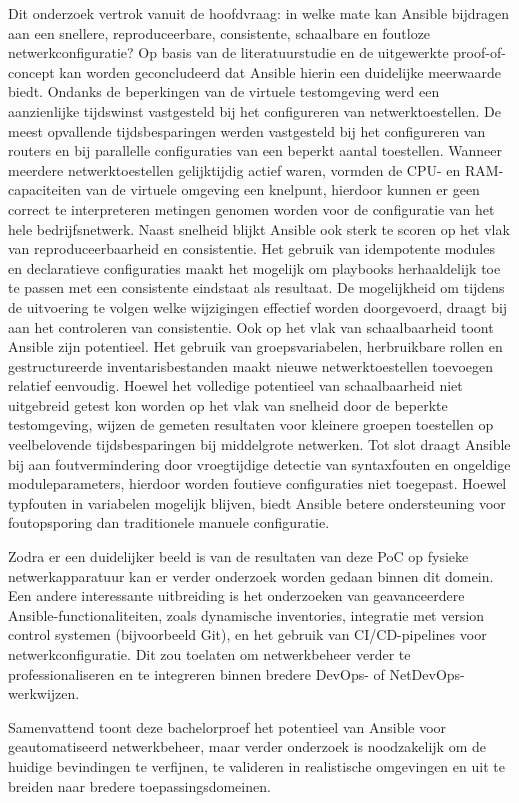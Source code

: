 Dit onderzoek vertrok vanuit de hoofdvraag: in welke mate kan Ansible bijdragen aan een snellere, reproduceerbare, consistente, schaalbare en foutloze netwerkconfiguratie?
Op basis van de literatuurstudie en de uitgewerkte proof-of-concept kan worden geconcludeerd dat Ansible hierin een duidelijke meerwaarde biedt.
Ondanks de beperkingen van de virtuele testomgeving werd een aanzienlijke tijdswinst vastgesteld bij het configureren van netwerktoestellen. 
De meest opvallende tijdsbesparingen werden vastgesteld bij het configureren van routers en bij parallelle configuraties van een beperkt aantal toestellen. 
Wanneer meerdere netwerktoestellen gelijktijdig actief waren, vormden de CPU- en RAM-capaciteiten van de virtuele omgeving een knelpunt, hierdoor kunnen er geen correct te interpreteren metingen genomen worden voor de configuratie van het hele bedrijfsnetwerk.
Naast snelheid blijkt Ansible ook sterk te scoren op het vlak van reproduceerbaarheid en consistentie. Het gebruik van idempotente modules en declaratieve configuraties maakt het mogelijk om playbooks herhaaldelijk toe te passen met een consistente eindstaat als resultaat.
De mogelijkheid om tijdens de uitvoering te volgen welke wijzigingen effectief worden doorgevoerd, draagt bij aan het controleren van consistentie.
Ook op het vlak van schaalbaarheid toont Ansible zijn potentieel. Het gebruik van groepsvariabelen, herbruikbare rollen en gestructureerde inventarisbestanden maakt nieuwe netwerktoestellen toevoegen relatief eenvoudig.
Hoewel het volledige potentieel van schaalbaarheid niet uitgebreid getest kon worden op het vlak van snelheid door de beperkte testomgeving, wijzen de gemeten resultaten voor kleinere groepen toestellen op veelbelovende tijdsbesparingen bij middelgrote netwerken.
Tot slot draagt Ansible bij aan foutvermindering door vroegtijdige detectie van syntaxfouten en ongeldige moduleparameters, hierdoor worden foutieve configuraties niet toegepast. 
Hoewel typfouten in variabelen mogelijk blijven, biedt Ansible betere ondersteuning voor foutopsporing dan traditionele manuele configuratie.
\vspace{1em}

Zodra er een duidelijker beeld is van de resultaten van deze PoC op fysieke netwerkapparatuur kan er verder onderzoek worden gedaan binnen dit domein.
Een andere interessante uitbreiding is het onderzoeken van geavanceerdere Ansible-functionaliteiten, zoals dynamische inventories, integratie met version control systemen (bijvoorbeeld Git), en het gebruik van CI/CD-pipelines voor netwerkconfiguratie. 
Dit zou toelaten om netwerkbeheer verder te professionaliseren en te integreren binnen bredere DevOps- of NetDevOps-werkwijzen.

Samenvattend toont deze bachelorproef het potentieel van Ansible voor geautomatiseerd netwerkbeheer, maar verder onderzoek is noodzakelijk om de huidige bevindingen te verfijnen, te valideren in realistische omgevingen en uit te breiden naar bredere toepassingsdomeinen.